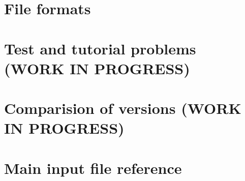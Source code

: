 \documentclass[12pt,a4paper]{report}
\begin{document}












%
%


\chapter{File formats}





% 
%   


\chapter{Test and tutorial problems (WORK IN PROGRESS)}
 \label{chapter:tests}
 
% 
 \chapter{Comparision of versions (WORK IN PROGRESS)}
 \label{chapter:version_comparision}
 

\chapter{Main input file reference}
\label{chapter:input-tree-reference}






\end{document}
